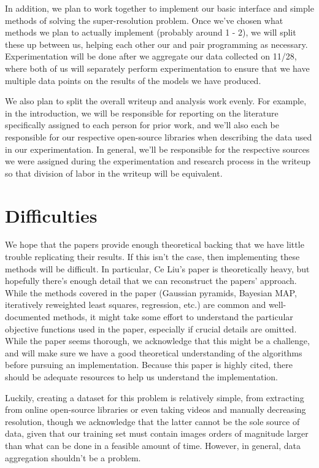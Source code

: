 \documentclass[10pt]{paper}
\numberwithin{equation}{section} %
\numberwithin{figure}{section} %
\numberwithin{table}{section} %
\begin{document}
In addition, we plan to work together to implement our basic interface and simple methods of solving the super-resolution problem. Once we've chosen what methods we plan to actually implement (probably around 1 - 2), we will split these up between us, helping each other our and pair programming as necessary. Experimentation will be done after we aggregate our data collected on 11/28, where both of us will separately perform experimentation to ensure that we have multiple data points on the results of the models we have produced.

We also plan to split the overall writeup and analysis work evenly. For example, in the introduction, we will be responsible for reporting on the literature specifically assigned to each person for prior work, and we'll also each be responsible for our respective open-source libraries when describing the data used in our experimentation. In general, we'll be responsible for the respective sources we were assigned during the experimentation and research process in the writeup so that division of labor in the writeup will be equivalent.  

\section{Difficulties}

We hope that the papers provide enough theoretical backing that we have little trouble replicating their results. If this isn't the case, then implementing these methods will be  difficult. In particular, Ce Liu's paper is theoretically heavy, but hopefully there's enough detail that we can reconstruct the papers' approach. While the methods covered in the paper (Gaussian pyramids, Bayesian MAP,  iteratively reweighted least squares, regression, etc.) are common and well-documented methods, it might take some effort to understand the particular objective functions used in the paper, especially if crucial details are omitted. While the paper seems thorough, we acknowledge that this might be a challenge, and will make sure we have a good theoretical understanding of the algorithms before pursuing an implementation. Because this paper is highly cited, there should be adequate resources to help us understand the implementation.

Luckily, creating a dataset for this problem is relatively simple, from extracting from online open-source libraries or even taking videos and manually decreasing resolution, though we acknowledge that the latter cannot be the sole source of data, given that our training set must contain images orders of magnitude larger than what can be done in a feasible amount of time. However, in general, data aggregation shouldn't be a problem. 
\end{document}
